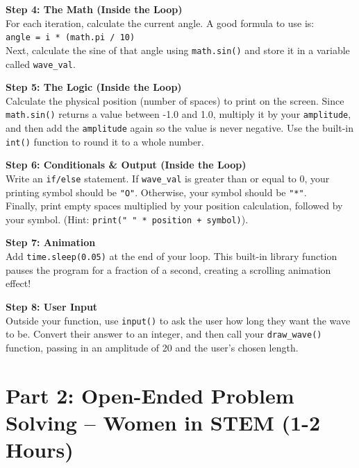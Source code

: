 \documentclass[11pt, a4paper]{article}
\begin{document}
\vspace{0.5em}
\textbf{Step 4: The Math (Inside the Loop)}\\
For each iteration, calculate the current angle. A good formula to use is: \\
\texttt{angle = i * (math.pi / 10)} \\
Next, calculate the sine of that angle using \texttt{math.sin()} and store it in a variable called \texttt{wave\_val}.

\vspace{0.5em}
\textbf{Step 5: The Logic (Inside the Loop)}\\
Calculate the physical position (number of spaces) to print on the screen. Since \texttt{math.sin()} returns a value between -1.0 and 1.0, multiply it by your \texttt{amplitude}, and then add the \texttt{amplitude} again so the value is never negative. Use the built-in \texttt{int()} function to round it to a whole number. 

\vspace{0.5em}
\textbf{Step 6: Conditionals \& Output (Inside the Loop)}\\
Write an \texttt{if/else} statement. If \texttt{wave\_val} is greater than or equal to 0, your printing symbol should be \texttt{"O"}. Otherwise, your symbol should be \texttt{"*"}. \\
Finally, print empty spaces multiplied by your position calculation, followed by your symbol. (Hint: \texttt{print(" " * position + symbol)}). 

\vspace{0.5em}
\textbf{Step 7: Animation}\\
Add \texttt{time.sleep(0.05)} at the end of your loop. This built-in library function pauses the program for a fraction of a second, creating a scrolling animation effect!

\vspace{0.5em}
\textbf{Step 8: User Input}\\
Outside your function, use \texttt{input()} to ask the user how long they want the wave to be. Convert their answer to an integer, and then call your \texttt{draw\_wave()} function, passing in an amplitude of 20 and the user's chosen length.

\vspace{2em}

\section*{Part 2: Open-Ended Problem Solving -- Women in STEM (1-2 Hours)}
\end{document}
